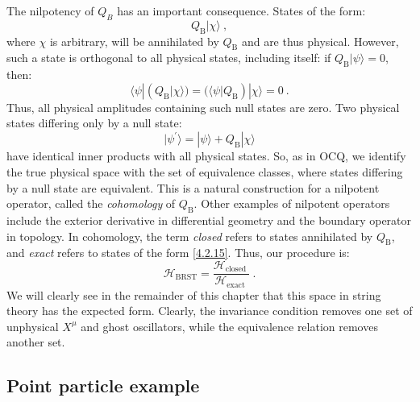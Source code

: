 The nilpotency of $Q_B$ has an important consequence. States of the form:
\begin{equation}\label{4.2.15}
	Q_{\mathrm{B}}|\chi\rangle \:,
\end{equation}
where $\chi$ is arbitrary, will be annihilated by $Q_{\mathrm{B}}$ and are thus physical. However, such a state is orthogonal to all physical states, including itself: if $Q_{\mathrm{B}}|\psi\rangle=0$, then:
\begin{equation}
	\langle\psi| (Q_{\mathrm{B}}|\chi\rangle)= (\langle\psi| Q_{\mathrm{B}})|\chi\rangle=0 \:. \label{4.2.16}
\end{equation}
Thus, all physical amplitudes containing such null states are zero. Two physical states differing only by a null state:
\begin{equation}
	\lvert \psi^{\prime} \rangle=|\psi\rangle+Q_{\mathrm{B}}|\chi\rangle \label{4.2.17}
\end{equation}
have identical inner products with all physical states. So, as in OCQ, we identify the true physical space with the set of equivalence classes, where states differing by a null state are equivalent. This is a natural construction for a nilpotent operator, called the \emph{cohomology} of $Q_{\mathrm{B}}$. Other examples of nilpotent operators include the exterior derivative in differential geometry and the boundary operator in topology. In cohomology, the term \emph{closed} refers to states annihilated by $Q_{\mathrm{B}}$, and \emph{exact} refers to states of the form \eqref{4.2.15}. Thus, our procedure is:
\begin{equation}
	\mathscr{H}_{\mathrm{BRST}}=\frac{\mathscr{H}_{\text {closed }}}{\mathscr{H}_{\text {exact }}} \:.\label{4.2.18}
\end{equation}
We will clearly see in the remainder of this chapter that this space in string theory has the expected form. Clearly, the invariance condition removes one set of unphysical $X^\mu$ and ghost oscillators, while the equivalence relation removes another set.

\subsection*{Point particle example}

